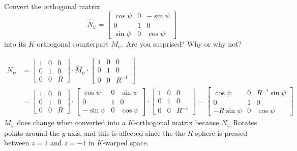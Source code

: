 \documentclass[newpage,hints,handout,noauthor,nooutcomes,12pt]{ximera}
\begin{document}
\begin{problem}
  Convert the orthogonal matrix
  \[
  \hat{N}_\psi=\begin{bmatrix}
  \cos\psi & 0 & -\sin\psi\\
  0 & 1 & 0\\
  \sin\psi & 0 & \cos\psi
  \end{bmatrix}
  \]
  into its $K$-orthogonal counterpart $M_\psi$. Are you surprised? Why or why not?
  
\begin{freeResponse}
\begin{align*}
N_\psi &= \begin{bmatrix}
1 & 0 & 0\\
0 & 1 & 0\\
0 & 0 & R%
\end{bmatrix} \cdot \hat{M}_\psi \cdot
\begin{bmatrix}
1 & 0 & 0\\
0 & 1 & 0\\
0 & 0 & R^{-1}%
\end{bmatrix} \\
&= \begin{bmatrix}
1 & 0 & 0\\
0 & 1 & 0\\
0 & 0 & R%
\end{bmatrix} \cdot 
\begin{bmatrix}
  \cos\psi & 0 & \sin\psi\\
  0 & 1 & 0\\
  -\sin\psi & 0 & \cos\psi
  \end{bmatrix} \cdot
\begin{bmatrix}
1 & 0 & 0\\
0 & 1 & 0\\
0 & 0 & R^{-1}%
\end{bmatrix}
=\begin{bmatrix}
  \cos\psi & 0 & R^{-1} \sin\psi\\
  0 & 1 & 0\\
  -R\sin\psi & 0 & \cos\psi
  \end{bmatrix} 
\end{align*} 
$M_\psi$ does change when converted into a $K$-orthogonal matrix because $N_\psi$ Rotates points around the $y$-axis, and this is affected since the  the $R$-sphere is pressed between $z=1$ and $z=-1$ in $K$-warped space. 
\end{freeResponse}

\end{problem}
\end{document}
